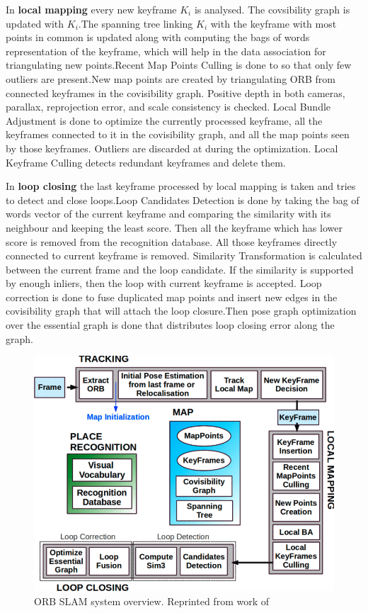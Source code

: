 In \textbf{local mapping} every new keyframe $K_i$ is analysed. The covsibility graph is updated with $K_i$.The spanning tree linking $K_i$ with the keyframe with most points in common is updated along with computing the bags of words representation of the keyframe, which will help in the data association for triangulating new points.Recent Map Points Culling is done to so that only few outliers are present.New map points are created by triangulating ORB from connected keyframes in the covisibility graph. Positive depth in both cameras, parallax, reprojection error, and scale consistency is checked. Local Bundle Adjustment is done to optimize the currently processed keyframe, all the keyframes connected to it in the covisibility graph, and all the map points seen by those keyframes. Outliers are discarded at during the optimization. Local Keyframe Culling detects redundant keyframes and delete them.

In \textbf{loop closing}  the last keyframe processed by local mapping is taken and tries to detect and close loops.Loop Candidates Detection is done by taking the bag of words vector of the current keyframe and comparing the similarity with its neighbour and keeping the least score. Then all the keyframe which has lower score is removed from the recognition database. All those keyframes directly connected to current keyframe is removed. Similarity Transformation is calculated between the current frame and the loop candidate. If the similarity is supported by enough inliers, then the loop with current keyframe is accepted. Loop correction is done to fuse duplicated map points and insert new edges in the covisibility graph that will attach the loop closure.Then pose graph optimization over the essential graph is done that distributes loop closing error along the graph. 


\begin{figure}
	\centering
	\includegraphics[width=5in]{figures/orb_slam1}
	\caption[ORB SLAM architecture]{\small 
		ORB SLAM system overview. Reprinted from work of  }
	\label{fig:orb_slam1}
\end{figure}

